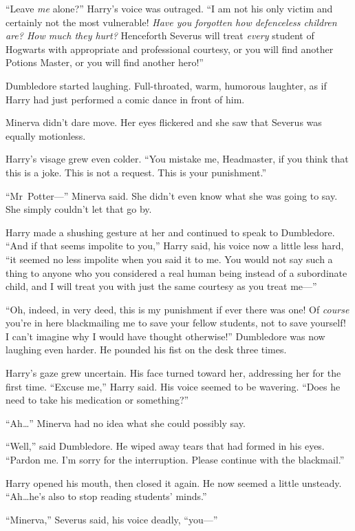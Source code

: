 “Leave \emph{me} alone?” Harry’s voice was outraged. “I am not his only victim and certainly not the most vulnerable! \emph{Have you forgotten how defenceless children are? How much they hurt?} Henceforth Severus will treat \emph{every} student of Hogwarts with appropriate and professional courtesy, or you will find another Potions Master, or you will find another hero!”

Dumbledore started laughing. Full-throated, warm, humorous laughter, as if Harry had just performed a comic dance in front of him.

Minerva didn’t dare move. Her eyes flickered and she saw that Severus was equally motionless.

Harry’s visage grew even colder. “You mistake me, Headmaster, if you think that this is a joke. This is not a request. This is your punishment.”

“Mr~Potter—” Minerva said. She didn’t even know what she was going to say. She simply couldn’t let that go by.

Harry made a shushing gesture at her and continued to speak to Dumbledore. “And if that seems impolite to you,” Harry said, his voice now a little less hard, “it seemed no less impolite when you said it to me. You would not say such a thing to anyone who you considered a real human being instead of a subordinate child, and I will treat you with just the same courtesy as you treat me—”

“Oh, indeed, in very deed, this is my punishment if ever there was one! Of \emph{course} you’re in here blackmailing me to save your fellow students, not to save yourself! I can’t imagine why I would have thought otherwise!” Dumbledore was now laughing even harder. He pounded his fist on the desk three times.

Harry’s gaze grew uncertain. His face turned toward her, addressing her for the first time. “Excuse me,” Harry said. His voice seemed to be wavering. “Does he need to take his medication or something?”

“Ah…” Minerva had no idea what she could possibly say.

“Well,” said Dumbledore. He wiped away tears that had formed in his eyes. “Pardon me. I’m sorry for the interruption. Please continue with the blackmail.”

Harry opened his mouth, then closed it again. He now seemed a little unsteady. “Ah…he’s also to stop reading students’ minds.”

“Minerva,” Severus said, his voice deadly, “you—”

